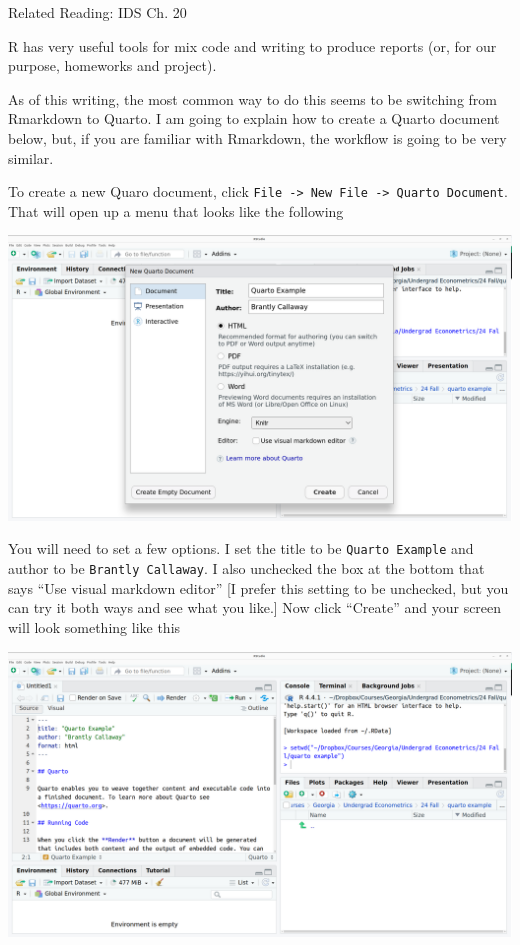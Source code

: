 \documentclass[
  letterpaper,
  DIV=11,
  numbers=noendperiod]{scrreprt}
\begin{document}
Related Reading: IDS Ch. 20

R has very useful tools for mix code and writing to produce reports (or,
for our purpose, homeworks and project).

As of this writing, the most common way to do this seems to be switching
from Rmarkdown to Quarto. I am going to explain how to create a Quarto
document below, but, if you are familiar with Rmarkdown, the workflow is
going to be very similar.

To create a new Quaro document, click
\texttt{File\ -\textgreater{}\ New\ File\ -\textgreater{}\ Quarto\ Document}.
That will open up a menu that looks like the following

\includegraphics{quarto_setup.png}

You will need to set a few options. I set the title to be
\texttt{Quarto\ Example} and author to be \texttt{Brantly\ Callaway}. I
also unchecked the box at the bottom that says ``Use visual markdown
editor'' {[}I prefer this setting to be unchecked, but you can try it
both ways and see what you like.{]} Now click ``Create'' and your screen
will look something like this

\includegraphics{quarto_file.png}
\end{document}
